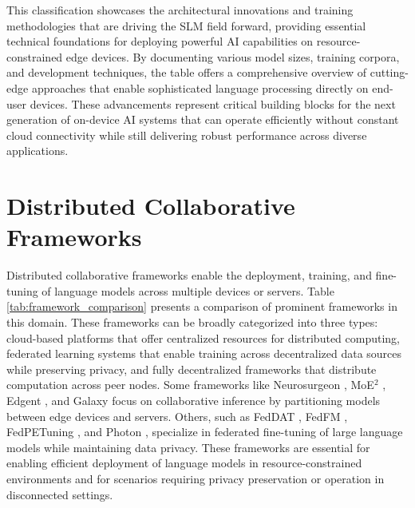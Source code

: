     This classification showcases the architectural innovations and training methodologies that are driving the SLM field forward, providing essential technical foundations for deploying powerful AI capabilities on resource-constrained edge devices. By documenting various model sizes, training corpora, and development techniques, the table offers a comprehensive overview of cutting-edge approaches that enable sophisticated language processing directly on end-user devices. These advancements represent critical building blocks for the next generation of on-device AI systems that can operate efficiently without constant cloud connectivity while still delivering robust performance across diverse applications.


\newpage
\section{Distributed Collaborative Frameworks}
\label{app:distributed_collaborative_frameworks}
Distributed collaborative frameworks enable the deployment, training, and fine-tuning of language models across multiple devices or servers. Table \ref{tab:framework_comparison} presents a comparison of prominent frameworks in this domain. These frameworks can be broadly categorized into three types: cloud-based platforms that offer centralized resources for distributed computing, federated learning systems that enable training across decentralized data sources while preserving privacy, and fully decentralized frameworks that distribute computation across peer nodes. Some frameworks like Neurosurgeon \cite{kang2017neurosurgeon}, MoE$^2$ \cite{jin2025moe2}, Edgent \cite{li2018edgent}, and Galaxy \cite{ye2024galaxy} focus on collaborative inference by partitioning models between edge devices and servers. Others, such as FedDAT \cite{chen2024feddat}, FedFM \cite{yang2025federated}, FedPETuning \cite{zhang2023fedpetuning}, and Photon \cite{sani2024photon}, specialize in federated fine-tuning of large language models while maintaining data privacy. These frameworks are essential for enabling efficient deployment of language models in resource-constrained environments and for scenarios requiring privacy preservation or operation in disconnected settings.

